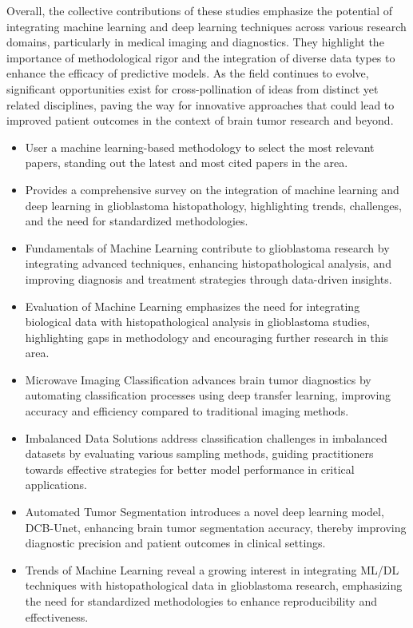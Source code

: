 \documentclass[runningheads]{llncs}
\begin{document}
Overall, the collective contributions of these studies emphasize the potential of integrating machine learning and deep learning techniques across various research domains, particularly in medical imaging and diagnostics. They highlight the importance of methodological rigor and the integration of diverse data types to enhance the efficacy of predictive models. As the field continues to evolve, significant opportunities exist for cross-pollination of ideas from distinct yet related disciplines, paving the way for innovative approaches that could lead to improved patient outcomes in the context of brain tumor research and beyond.

\begin{itemize}[label=\textbullet]
    \item User a machine learning-based methodology to select the most relevant papers, standing out the latest and most cited papers in the area.
    \item Provides a comprehensive survey on the integration of machine learning and deep learning in glioblastoma histopathology, highlighting trends, challenges, and the need for standardized methodologies.
    \item Fundamentals of Machine Learning contribute to glioblastoma research by integrating advanced techniques, enhancing histopathological analysis, and improving diagnosis and treatment strategies through data-driven insights.
    \item Evaluation of Machine Learning emphasizes the need for integrating biological data with histopathological analysis in glioblastoma studies, highlighting gaps in methodology and encouraging further research in this area.
    \item Microwave Imaging Classification advances brain tumor diagnostics by automating classification processes using deep transfer learning, improving accuracy and efficiency compared to traditional imaging methods.
    \item Imbalanced Data Solutions address classification challenges in imbalanced datasets by evaluating various sampling methods, guiding practitioners towards effective strategies for better model performance in critical applications.
    \item Automated Tumor Segmentation introduces a novel deep learning model, DCB-Unet, enhancing brain tumor segmentation accuracy, thereby improving diagnostic precision and patient outcomes in clinical settings.
    \item Trends of Machine Learning reveal a growing interest in integrating ML/DL techniques with histopathological data in glioblastoma research, emphasizing the need for standardized methodologies to enhance reproducibility and effectiveness.
\end{itemize}
\end{document}
